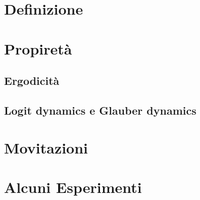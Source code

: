 \section{Definizione}

\section{Propiretà}
\subsection{Ergodicità}
\subsection{Logit dynamics e Glauber dynamics}

\section{Movitazioni}

\section{Alcuni Esperimenti}